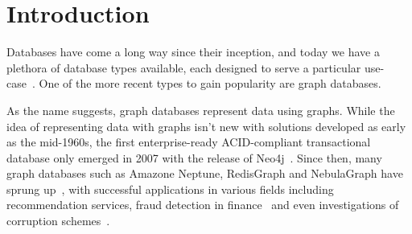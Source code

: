 \documentclass[14pt]{constructor-thesis}
\theoremstyle{definition}
\begin{document}
\maketitle
\tableofcontents
\section*{Introduction}

Databases have come a long way since their inception, and today we have a plethora of database types available, each designed to serve a particular use-case~\cite{database-types}. One of the more recent types to gain popularity are graph databases.

As the name suggests, graph databases represent data using graphs. While the idea of representing data with graphs isn't new with solutions developed as early as the mid-1960s, the first enterprise-ready ACID-compliant transactional database only emerged in 2007 with the release of Neo4j~\cite{enwiki:1146498781}. Since then, many graph databases such as Amazone Neptune, RedisGraph and NebulaGraph have sprung up~\cite{enwiki:1146498781}, with successful applications in various fields including recommendation services, fraud detection in finance~\cite{neo4j:use-cases} and even investigations of corruption schemes~\cite{icij:offshoreleaks}.

\end{document}

